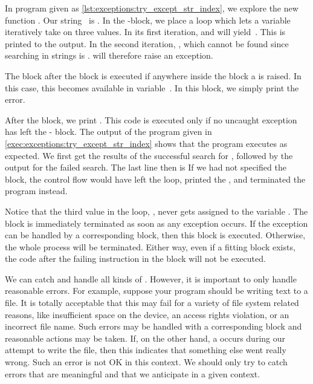 In program  given as \cref{lst:exceptions:try_except_str_index}, we explore the new function .
Our string~ is .
In the -block, we place a  loop which lets a variable~ iteratively take on three values.
In its first iteration,  and  will yield~.
This is printed to the output.
In the second iteration, , which cannot be found since searching in strings is .
 will therefore raise an exception.

The  block after the  block is executed if anywhere inside the  block a  is raised.
In this case, this  becomes available in variable~.
In this block, we simply print the error.

After the block, we print .
This code is executed only if no uncaught exception has left the - block.
The output of the program given in \cref{exec:exceptions:try_except_str_index} shows that the program executes as expected.
We first get the results of the successful search for , followed by the output for the failed search.
The last line then is 
If we had not specified the  block, the control flow would have left the loop, printed the , and terminated the program instead.

Notice that the third value in the loop, , never gets assigned to the variable .
The  block is immediately terminated as soon as any exception occurs.
If the exception can be handled by a corresponding  block, then this block is executed.
Otherwise, the whole process will be terminated.
Either way, even if a fitting  block exists, the code after the failing instruction in the  block will not be executed.

We can catch and handle all kinds of .
However, it is important to only handle reasonable errors.
For example, suppose your program should be writing text to a file.
It is totally acceptable that this may fail for a variety of file system related reasons, like insufficient space on the device, an access rights violation, or an incorrect file name.
Such errors may be handled with a corresponding  block and reasonable actions may be taken.
If, on the other hand, a  occurs during our attempt to write the file, then this indicates that something else went really wrong.
Such an error is not OK in this context.
We should only try to catch errors that are meaningful and that we anticipate in a given context.

